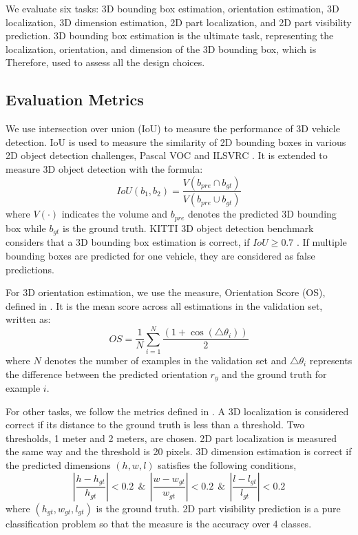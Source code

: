 \documentclass[a4paper,12pt]{article}
\begin{document}
We evaluate six tasks: 3D bounding box estimation, orientation estimation, 3D localization, 3D dimension estimation, 2D part localization, and 2D part visibility prediction. 3D bounding box estimation is the ultimate task, representing the localization, orientation, and dimension of the 3D bounding box,  which is Therefore, used to assess all the design choices.
\subsection{Evaluation Metrics}
\label{eval_met}

We use intersection over union (IoU) to measure the performance of 3D vehicle detection. IoU is used to measure the similarity of 2D bounding boxes in various 2D object detection challenges, \eg Pascal VOC \cite{Everingham15} and ILSVRC \cite{DBLP:Russakovsky14}. It is extended to measure 3D object detection with the formula:
\begin{equation}
	IoU(b_1, b_2) = \frac{V(b_{pre}\cap b_{gt})}{V(b_{pre}\cup b_{gt})}
\end{equation}
where $V(\cdot)$ indicates the volume and $b_{pre}$ denotes the predicted 3D bounding box while $b_{gt}$ is the ground truth. KITTI 3D object detection benchmark considers that a 3D bounding box estimation is correct, if $IoU \geq 0.7$ \cite{Geiger2012CVPR}. If multiple bounding boxes are predicted for one vehicle, they are considered as false predictions. %

For 3D orientation estimation, we use the measure, Orientation Score (OS), defined in \cite{DBLP:journals/corr/MousavianAFK16}. It is the mean score across all estimations in the validation set, written as:
\begin{equation}
	OS =\frac{1}{N} \sum_{i=1}^N\frac{(1+\cos(\triangle \theta_i))}{2}
\end{equation}
where $N$ denotes the number of examples in the validation set and $\triangle \theta_i$ represents the difference between the predicted orientation $r_y$ and the ground truth for example $i$.

 For other tasks, we follow the metrics defined in \cite{DBLP:journals/corr/ChabotCRTC17}. A 3D localization is considered correct if its distance to the ground truth is less than a threshold. Two thresholds, 1 meter and 2 meters, are chosen. 2D part localization is measured the same way and the threshold is 20 pixels. 3D dimension estimation is correct if the predicted dimensions $(h, w, l)$ satisfies the following conditions,
\begin{equation}
	\left | \frac{h-h_{gt}}{h_{gt}} \right | < 0.2  ~~\&~~\left | \frac{w-w_{gt}}{w_{gt}} \right | < 0.2  ~~\&~~ \left | \frac{l-l_{gt}}{l_{gt}} \right | < 0.2
\end{equation}
where $(h_{gt}, w_{gt}, l_{gt})$ is the ground truth. 2D part visibility prediction is a pure classification problem so that the measure is the accuracy over 4 classes.
\end{document}
